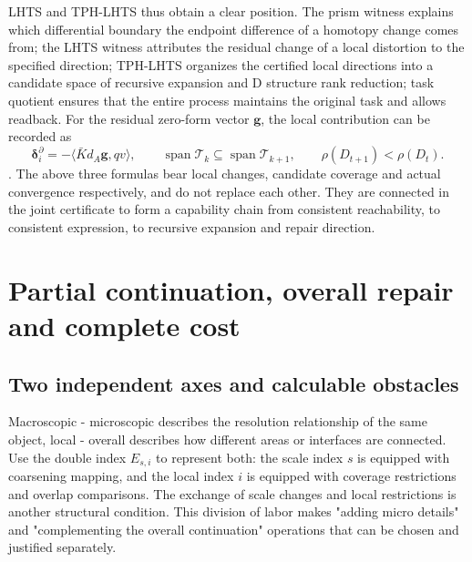 \documentclass[11pt,a4paper]{article}
\theoremstyle{plain}
\theoremstyle{definition}
\theoremstyle{remark}
\begin{document}
\begin{CJK*}
LHTS and TPH-LHTS thus obtain a clear position. The prism witness explains which differential boundary the endpoint difference of a homotopy change comes from; the LHTS witness attributes the residual change of a local distortion to the specified direction; TPH-LHTS organizes the certified local directions into a candidate space of recursive expansion and D structure rank reduction; task quotient ensures that the entire process maintains the original task and allows readback. For the residual zero-form vector $\mathbf g$, the local contribution can be recorded as \[
 \boldsymbol\delta_i^{\partial}=-\langle\bar Kd_A\mathbf g,qv\rangle,
 \qquad \operatorname{span}\mathcal T_k\subseteq\operatorname{span}\mathcal T_{k+1},
 \qquad \rho(D_{t+1})<\rho(D_t).
\]. The above three formulas bear local changes, candidate coverage and actual convergence respectively, and do not replace each other. They are connected in the joint certificate to form a capability chain from consistent reachability, to consistent expression, to recursive expansion and repair direction.

\section { Partial continuation, overall repair and complete cost }\label{pc:structure-cost}


\subsection { Two independent axes and calculable obstacles }

Macroscopic - microscopic describes the resolution relationship of the same object, local - overall describes how different areas or interfaces are connected. Use the double index $E_{s,i}$ to represent both: the scale index $s$ is equipped with coarsening mapping, and the local index $i$ is equipped with coverage restrictions and overlap comparisons. The exchange of scale changes and local restrictions is another structural condition. This division of labor makes "adding micro details" and "complementing the overall continuation" operations that can be chosen and justified separately.


\end{CJK*}
\end{document}
